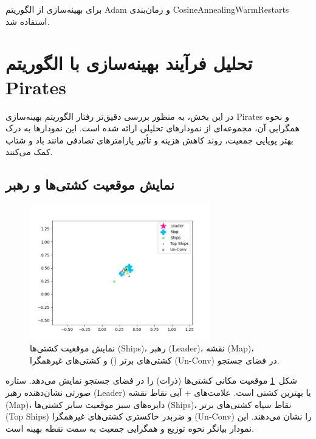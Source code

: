 برای بهینه‌سازی از الگوریتم Adam و زمان‌بندی CosineAnnealingWarmRestarts استفاده شد.
\section{تحلیل فرآیند بهینه‌سازی با الگوریتم Pirates}
در این بخش، به منظور بررسی دقیق‌تر رفتار الگوریتم بهینه‌سازی Pirates و نحوه همگرایی آن، مجموعه‌ای از نمودارهای تحلیلی ارائه شده است. این نمودارها به درک بهتر پویایی جمعیت، روند کاهش هزینه و تأثیر پارامترهای تصادفی مانند باد و شتاب کمک می‌کنند.

\subsection{نمایش موقعیت کشتی‌ها و رهبر}
\begin{figure}[h!]
    \centering
    \includegraphics[width=0.7\textwidth]{images/pirates_positions.png}
    \caption{نمایش موقعیت کشتی‌ها (Ships)، رهبر (Leader)، نقشه (Map)، کشتی‌های برتر () و کشتی‌های غیرهمگرا (Un-Conv) در فضای جستجو.}
    \label{fig:pirates_positions}
\end{figure}

شکل~\ref{fig:pirates_positions} موقعیت مکانی کشتی‌ها (ذرات) را در فضای جستجو نمایش می‌دهد. ستاره صورتی نشان‌دهنده رهبر (Leader) یا بهترین کشتی است. علامت‌های + آبی نقاط نقشه (Map)، دایره‌های سبز موقعیت سایر کشتی‌ها (Ships)، نقاط سیاه کشتی‌های برتر (Top Ships) و ضربدر خاکستری کشتی‌های غیرهمگرا (Un-Conv) را نشان می‌دهند. این نمودار بیانگر نحوه توزیع و همگرایی جمعیت به سمت نقطه بهینه است.

